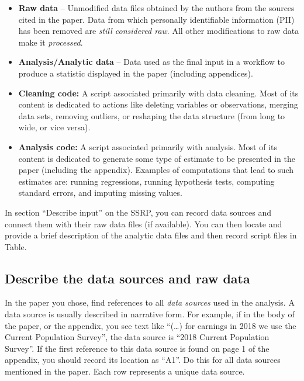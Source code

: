 \documentclass[
]{book}
\providecommand{\tightlist}{%
  \setlength{\itemsep}{0pt}\setlength{\parskip}{0pt}}
\begin{document}
\begin{itemize}
\tightlist
\item
  \textbf{Raw data} -- Unmodified data files obtained by the authors from the sources cited in the paper. Data from which personally identifiable information (PII) has been removed are \emph{still considered raw}. All other modifications to raw data make it \emph{processed}.\\
\item
  \textbf{Analysis/Analytic data} -- Data used as the final input in a workflow to produce a statistic displayed in the paper (including appendices).\\
\item
  \textbf{Cleaning code:} A script associated primarily with data cleaning. Most of its content is dedicated to actions like deleting variables or observations, merging data sets, removing outliers, or reshaping the data structure (from long to wide, or vice versa).\\
\item
  \textbf{Analysis code:} A script associated primarily with analysis. Most of its content is dedicated to generate some type of estimate to be presented in the paper (including the appendix). Examples of computations that lead to such estimates are: running regressions, running hypothesis tests, computing standard errors, and imputing missing values.
\end{itemize}

In section ``Describe input'' on the SSRP, you can record data sources and connect them with their raw data files (if available). You can then locate and provide a brief description of the analytic data files and then record script files in Table.

\hypertarget{desc-sourc}{%
\subsection{Describe the data sources and raw data}\label{desc-sourc}}

In the paper you chose, find references to all \emph{data sources} used in the analysis. A data source is usually described in narrative form. For example, if in the body of the paper, or the appendix, you see text like ``(\ldots) for earnings in 2018 we use the Current Population Survey'', the data source is ``2018 Current Population Survey''. If the first reference to this data source is found on page 1 of the appendix, you should record its location as ``A1''. Do this for all data sources mentioned in the paper. Each row represents a unique data source.
\end{document}
